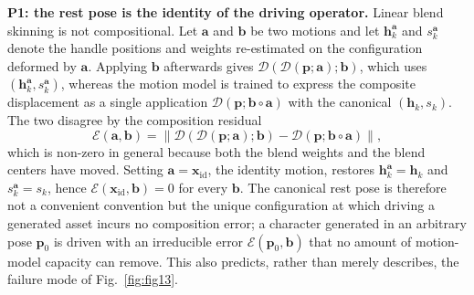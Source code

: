 \documentclass[lettersize,journal]{IEEEtran}
\begin{document}
\textbf{P1: the rest pose is the identity of the driving operator.} Linear blend skinning is
not compositional. Let $\bm{a}$ and $\bm{b}$ be two motions and let $\bm{h}^{\bm{a}}_{k}$ and
$s^{\bm{a}}_{k}$ denote the handle positions and weights re-estimated on the configuration
deformed by $\bm{a}$. Applying $\bm{b}$ afterwards gives
$\mathcal{D}(\mathcal{D}(\bm{p};\bm{a});\bm{b})$, which uses
$(\bm{h}^{\bm{a}}_{k},s^{\bm{a}}_{k})$, whereas the motion model is trained to express the
composite displacement as a single application $\mathcal{D}(\bm{p};\bm{b}\!\circ\!\bm{a})$
with the canonical $(\bm{h}_{k},s_{k})$. The two disagree by the composition residual
\begin{equation} \label{Eq.resid}
\mathcal{E}(\bm{a},\bm{b})=
\big\lVert\mathcal{D}(\mathcal{D}(\bm{p};\bm{a});\bm{b})-
\mathcal{D}(\bm{p};\bm{b}\!\circ\!\bm{a})\big\rVert ,
\end{equation}
which is non-zero in general because both the blend weights and the blend centers have moved.
Setting $\bm{a}=\bm{x}_{\text{id}}$, the identity motion, restores
$\bm{h}^{\bm{a}}_{k}=\bm{h}_{k}$ and $s^{\bm{a}}_{k}=s_{k}$, hence
$\mathcal{E}(\bm{x}_{\text{id}},\bm{b})=0$ for every $\bm{b}$. The canonical rest pose is
therefore not a convenient convention but the unique configuration at which driving a
generated asset incurs no composition error; a character generated in an arbitrary pose
$\bm{p}_{0}$ is driven with an irreducible error $\mathcal{E}(\bm{p}_{0},\bm{b})$ that no
amount of motion-model capacity can remove. This also predicts, rather than merely
describes, the failure mode of Fig.~\ref{fig:fig13}.
\end{document}
